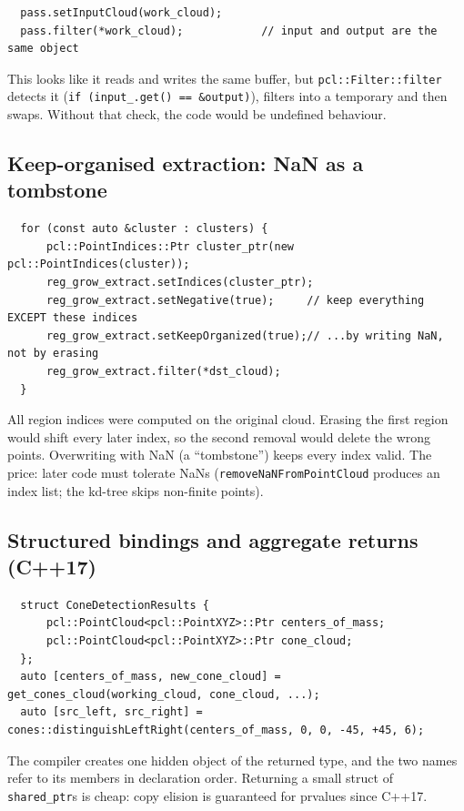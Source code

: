 \documentclass[10pt,a4paper]{scrartcl}
\newcommand{\code}[1]{\texttt{#1}}
\begin{document}
  \begin{lstlisting}
  pass.setInputCloud(work_cloud);
  pass.filter(*work_cloud);            // input and output are the same object
  \end{lstlisting}
  This looks like it reads and writes the same buffer, but
  \code{pcl::Filter::filter} detects it (\code{if (input\_.get() == \&output)}),
  filters into a temporary and then swaps. Without that check, the code would be
  undefined behaviour.

  \subsection{Keep-organised extraction: NaN as a tombstone}

  \begin{lstlisting}
  for (const auto &cluster : clusters) {
      pcl::PointIndices::Ptr cluster_ptr(new pcl::PointIndices(cluster));
      reg_grow_extract.setIndices(cluster_ptr);
      reg_grow_extract.setNegative(true);     // keep everything EXCEPT these indices
      reg_grow_extract.setKeepOrganized(true);// ...by writing NaN, not by erasing
      reg_grow_extract.filter(*dst_cloud);
  }
  \end{lstlisting}
  All region indices were computed on the original cloud. Erasing the first region
  would shift every later index, so the second removal would delete the wrong points.
  Overwriting with NaN (a ``tombstone'') keeps every index valid. The price: later code
  must tolerate NaNs (\code{removeNaNFromPointCloud} produces an index list; the
  kd-tree skips non-finite points).

  \subsection{Structured bindings and aggregate returns (C++17)}

  \begin{lstlisting}
  struct ConeDetectionResults {
      pcl::PointCloud<pcl::PointXYZ>::Ptr centers_of_mass;
      pcl::PointCloud<pcl::PointXYZ>::Ptr cone_cloud;
  };
  auto [centers_of_mass, new_cone_cloud] = get_cones_cloud(working_cloud, cone_cloud, ...);
  auto [src_left, src_right] = cones::distinguishLeftRight(centers_of_mass, 0, 0, -45, +45, 6);
  \end{lstlisting}
  The compiler creates one hidden object of the returned type, and the two names
  refer to its members in declaration order. Returning a small struct of
  \code{shared\_ptr}s is cheap: copy elision is guaranteed for prvalues since C++17.
\end{document}
